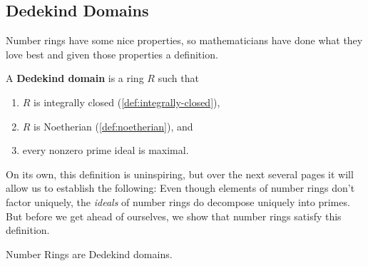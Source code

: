 \subsection{Dedekind Domains}

Number rings have some nice properties, so mathematicians have done what they love best and given those properties a definition.

\begin{definition}
    \label{def:dedekin-domain}
    A \textbf{Dedekind domain} is a ring $R$ such that
    \begin{enumerate}
        \item $R$ is integrally closed (\autoref{def:integrally-closed}),
        \item $R$ is Noetherian (\autoref{def:noetherian}), and
        \item every nonzero prime ideal is maximal.
    \end{enumerate}
\end{definition}

On its own, this definition is uninspiring, but over the next several pages it will allow us to establish the following: Even though elements of number rings don't factor uniquely, the \emph{ideals} of number rings do decompose uniquely into primes. But before we get ahead of ourselves, we show that number rings satisfy this definition.

\begin{theorem}
    Number Rings are Dedekind domains.
\end{theorem}

